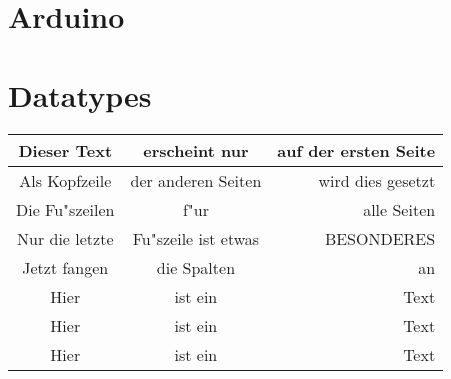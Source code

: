 \documentclass[english, 10pt]{report}
\begin{document}
\tableofcontents

\chapter{Arduino}

\chapter{Datatypes}



\begin{longtable}{||c|c|r||}
Dieser Text & erscheint nur & auf der ersten Seite\\ \hline\hline
\endfirsthead
Als Kopfzeile & der anderen Seiten & wird dies gesetzt\\ \hline
\endhead
Die Fu"szeilen & f"ur & alle Seiten \\ \hline\hline
\endfoot
Nur die letzte & Fu"szeile ist etwas & BESONDERES \\ \hline\hline
\endlastfoot
Jetzt fangen & die Spalten & an\\
Hier & ist ein & Text\\
Hier & ist ein & Text\\ \hline
Hier & ist ein & Text\\
\end{longtable}
\end{document}
